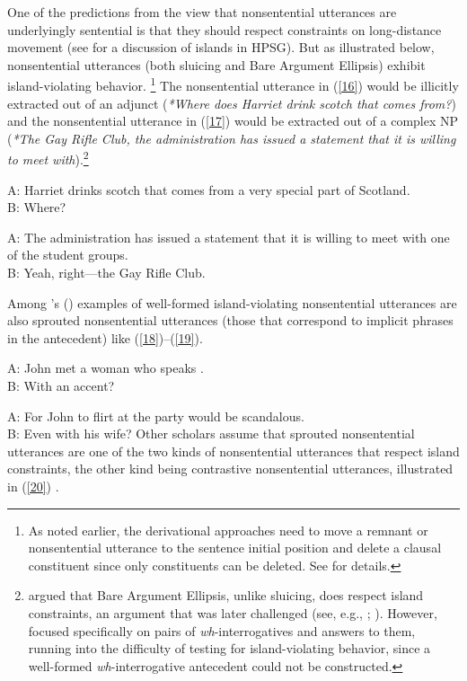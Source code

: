 One of the predictions from the view that nonsentential utterances are underlyingly sentential is that they should respect  constraints on long-distance movement (see  for a discussion of islands in HPSG). But as illustrated below, nonsentential utterances (both sluicing and Bare Argument Ellipsis) exhibit island-violating behavior.%
\footnote{As noted earlier, the derivational approaches need to move a remnant or nonsentential utterance to the sentence initial position and delete a clausal constituent since only constituents can be deleted. See  for details.} The nonsentential utterance  in (\ref{16}) would be illicitly extracted out of an adjunct (\textit{*Where does Harriet drink scotch that comes from?}) and the nonsentential utterance  in (\ref{17}) would be extracted out of a complex NP (\textit{*The Gay Rifle Club, the administration has issued a statement that it is willing to meet with}).\footnote{\citet{Merchant2005a} argued that Bare Argument Ellipsis, unlike sluicing, does respect island constraints, an argument that was later challenged (see, e.g., \citealt[239]{CJ2005a}; \citealt{Griffiths2014}). However, \citet{Merchant2005a} focused specifically on pairs of \emph{wh}-interrogatives and answers to them, running into the difficulty of testing for island-violating behavior, since a well-formed \emph{wh}-interrogative antecedent could not be constructed.}

\ea A: Harriet drinks scotch that comes from a very special part of Scotland.\\B: Where? \citep[245]{CJ2005a} \label{16}\z

\ea A: The administration has issued a statement that it is willing to meet with one of the student groups.\\B: Yeah, right---the Gay Rifle Club. \citep[245]{CJ2005a} \label{17}\z

Among \citeauthor{CJ2005a}'s (\citeyear[245]{CJ2005a}) examples of well-formed island-violating nonsentential utterances are also sprouted nonsentential utterances (those that correspond to implicit phrases in the antecedent) like (\ref{18})--(\ref{19}).

\ea A: John met a woman who speaks .\\B: With an  accent?\label{18}\z

\ea A: For John to flirt at the party would be scandalous. \\B: Even with his wife?\label{19}\z
Other scholars assume that sprouted nonsentential utterances are one of the two kinds of nonsentential utterances that respect island constraints, the other kind being contrastive nonsentential utterances, illustrated in (\ref{20}) \citep{Chung1995, Merchant2005a, Griffiths2014}.

